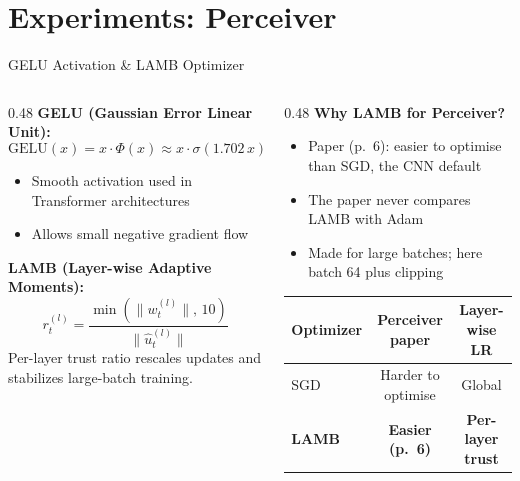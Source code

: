 \documentclass[aspectratio=169,11pt]{beamer}
\begin{document}
\section{Experiments: Perceiver}

\begin{frame}[shrink=5]{GELU Activation \& LAMB Optimizer}
  \begin{columns}[T,onlytextwidth]
    \begin{column}{0.48\textwidth}
      \small
      \textbf{GELU (Gaussian Error Linear Unit):}
      \[
      \text{GELU}(x) = x \cdot \Phi(x) \approx x \cdot \sigma(1.702\,x)
      \]
      \vspace{-0.25em}
      \begin{itemize}
        \item Smooth activation used in Transformer architectures
        \item Allows small negative gradient flow
      \end{itemize}

      \vspace{0.2em}
      \textbf{LAMB (Layer-wise Adaptive Moments):}
      \vspace{-0.25em}
      \[
      r_t^{(l)} = \frac{\min(\|w_t^{(l)}\|,\,10)}{\|\hat{u}_t^{(l)}\|}
      \]
      \vspace{-0.55em}
      {\footnotesize Per-layer trust ratio rescales updates and stabilizes large-batch training.}
    \end{column}
    \begin{column}{0.48\textwidth}
      \small
      \textbf{Why LAMB for Perceiver?}
      \begin{itemize}
        \item Paper (p.~6): easier to optimise than SGD, the CNN default
        \item The paper never compares LAMB with \alert{Adam}
        \item Made for large batches; here batch 64 plus clipping
      \end{itemize}

      \vspace{0.25em}
      \begin{table}
        \centering\scriptsize
        \begin{tabular}{lcc}
          \toprule
          \textbf{Optimizer} & \textbf{Perceiver paper} & \textbf{Layer-wise LR} \\
          \midrule
          SGD & Harder to optimise & Global \\
          \textbf{LAMB} & \textbf{Easier (p.~6)} & \textbf{Per-layer trust} \\
          \bottomrule
        \end{tabular}
      \end{table}
    \end{column}
  \end{columns}
\end{frame}
\end{document}
